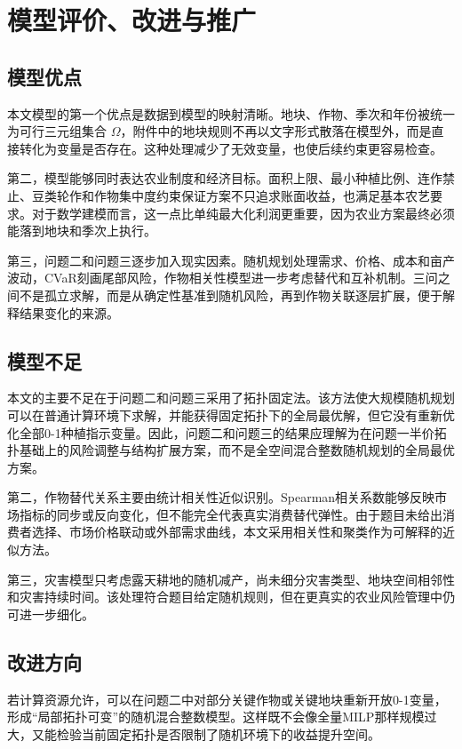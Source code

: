 \section{模型评价、改进与推广}

\subsection{模型优点}

本文模型的第一个优点是数据到模型的映射清晰。地块、作物、季次和年份被统一为可行三元组集合 $\Omega$，附件中的地块规则不再以文字形式散落在模型外，而是直接转化为变量是否存在。这种处理减少了无效变量，也使后续约束更容易检查。

第二，模型能够同时表达农业制度和经济目标。面积上限、最小种植比例、连作禁止、豆类轮作和作物集中度约束保证方案不只追求账面收益，也满足基本农艺要求。对于数学建模而言，这一点比单纯最大化利润更重要，因为农业方案最终必须能落到地块和季次上执行。

第三，问题二和问题三逐步加入现实因素。随机规划处理需求、价格、成本和亩产波动，CVaR刻画尾部风险，作物相关性模型进一步考虑替代和互补机制。三问之间不是孤立求解，而是从确定性基准到随机风险，再到作物关联逐层扩展，便于解释结果变化的来源。

\subsection{模型不足}

本文的主要不足在于问题二和问题三采用了拓扑固定法。该方法使大规模随机规划可以在普通计算环境下求解，并能获得固定拓扑下的全局最优解，但它没有重新优化全部0-1种植指示变量。因此，问题二和问题三的结果应理解为在问题一半价拓扑基础上的风险调整与结构扩展方案，而不是全空间混合整数随机规划的全局最优方案。

第二，作物替代关系主要由统计相关性近似识别。Spearman相关系数能够反映市场指标的同步或反向变化，但不能完全代表真实消费替代弹性。由于题目未给出消费者选择、市场价格联动或外部需求曲线，本文采用相关性和聚类作为可解释的近似方法。

第三，灾害模型只考虑露天耕地的随机减产，尚未细分灾害类型、地块空间相邻性和灾害持续时间。该处理符合题目给定随机规则，但在更真实的农业风险管理中仍可进一步细化。

\subsection{改进方向}

若计算资源允许，可以在问题二中对部分关键作物或关键地块重新开放0-1变量，形成“局部拓扑可变”的随机混合整数模型。这样既不会像全量MILP那样规模过大，又能检验当前固定拓扑是否限制了随机环境下的收益提升空间。

